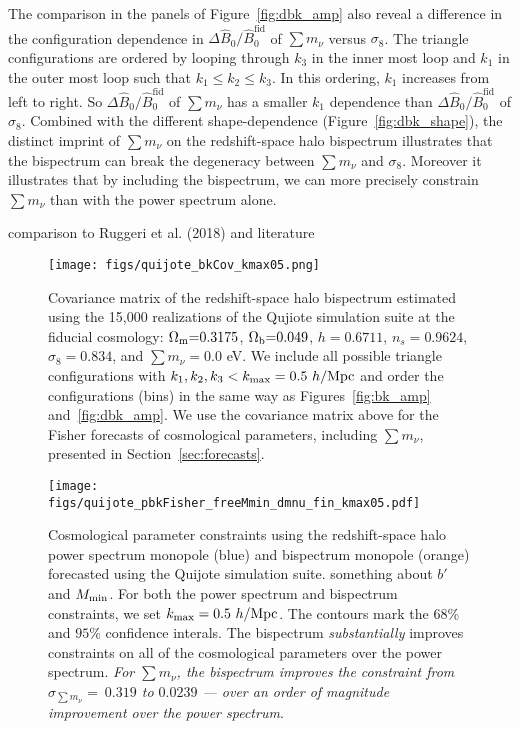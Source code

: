 \documentclass[12pt, letterpaper, preprint]{aastex62}
\newcommand{\Om}{\Omega_{\rm m}}
\newcommand{\Ob}{\Omega_{\rm b}}
\newcommand{\smnu}{\sum m_\nu}
\newcommand{\sig}{\sigma_8}
\newcommand{\BOk}{\widehat{B}_0}
\newcommand{\ch}[1]{{\color{orange}{\bf CH:} #1}}
\begin{document}
The comparison in the panels of Figure~\ref{fig:dbk_amp} also reveal a difference 
in the configuration dependence in $\Delta \BOk/\BOk^\mathrm{fid}$ of $\smnu$ 
versus $\sig$. The triangle configurations are ordered by looping through $k_3$ 
in the inner most loop and $k_1$ in the outer most loop such that $k_1 \leq k_2 \leq k_3$. 
In this ordering, $k_1$ increases from left to right. So $\Delta \BOk/\BOk^\mathrm{fid}$ 
of $\smnu$  has a smaller $k_1$ dependence than $\Delta \BOk/\BOk^\mathrm{fid}$ of 
$\sig$. Combined with the different shape-dependence (Figure~\ref{fig:dbk_shape}), 
the distinct imprint of $\smnu$ on the redshift-space halo bispectrum illustrates 
that the bispectrum can break the degeneracy between $\smnu$ and $\sig$. Moreover
it illustrates that by including the bispectrum, we can more precisely constrain 
$\smnu$ than with the power spectrum alone. 

\ch{comparison to Ruggeri et al. (2018) and literature} 

\begin{figure}
\begin{center}
    \texttt{[image: figs/quijote\_bkCov\_kmax05.png]} 
    \caption{Covariance matrix of the redshift-space halo bispectrum estimated 
    using the 15,000 realizations of the Qujiote simulation suite at the fiducial 
    cosmology: $\Om{=}0.3175$, $\Ob{=}0.049$, $h{=}0.6711$, $n_s{=}0.9624$, $\sig{=}0.834$, 
    and $\smnu{=}0.0$ eV. We include all possible triangle configurations with 
    $k_1, k_2, k_3 < k_{\rm max} = 0.5~h/{\rm Mpc}$ and order the configurations 
    (bins) in the same way as Figures~\ref{fig:bk_amp} and~\ref{fig:dbk_amp}. We 
    use the covariance matrix above for the Fisher forecasts of cosmological 
    parameters, including $\smnu$, presented in Section~\ref{sec:forecasts}. 
    }
\label{fig:bk_cov}
\end{center}
\end{figure}

\begin{figure}
\begin{center}
    \texttt{[image: figs/quijote\_pbkFisher\_freeMmin\_dmnu\_fin\_kmax05.pdf]}
    \caption{Cosmological parameter constraints using the redshift-space halo power spectrum 
    monopole (blue) and bispectrum monopole (orange) forecasted using the Quijote simulation 
    suite. \ch{something about $b'$ and $M_{\rm min}$}.
    For both the power spectrum and bispectrum constraints, we set $k_{\rm max} = 0.5~h/{\rm Mpc}$. The 
    contours mark the $68\%$ and $95\%$ confidence interals. The bispectrum 
    {\em substantially} improves constraints on all of the cosmological parameters 
    over the power spectrum. {\em For $\smnu$, the bispectrum improves the constraint
    from $\sigma_{\smnu}{=}~0.319$ to $0.0239$ --- over an order of magnitude 
    improvement over the power spectrum}.}
\label{fig:bk_fish}
\end{center}
\end{figure}
\end{document}
